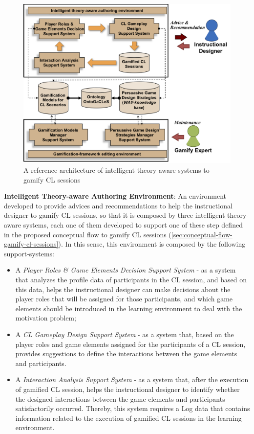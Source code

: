 \begin{figure}[htb]
 \caption{A reference architecture of intelligent theory-aware systems to gamify CL sessions}
 \label{fig:reference-architecture}
 \centering
 \includegraphics[width=1\textwidth]{images/chap-mechanisms-procedures/reference-architecture.png}
 \fautor
\end{figure}

\noindent
\textbf{Intelligent Theory-aware Authoring Environment}: An environment developed to provide advices and recommendations to help the instructional designer to gamify CL sessions, so that it is composed by three intelligent theory-aware systems, each one of them developed to support one of these step defined in the proposed conceptual flow to gamify CL sessions (\autoref{sec:conceptual-flow-gamify-cl-sessions}). In this sense, this environment is composed by the following support-systems:
\begin{itemize}
\item A \emph{Player Roles \& Game Elements Decision Support System} - as a system that analyzes the profile data of participants in the CL session, and based on this data, helps the instructional designer can make decisions about the player roles that will be assigned for those participants, and which game elements should be introduced in the learning environment to deal with the motivation problem;

\item A \emph{CL Gameplay Design Support System} - as a system that, based on the player roles and game elements assigned for the participants of a CL session, provides suggestions to define the interactions between the game elements and participants.

\item A \emph{Interaction Analysis Support System} - as a system that, after the execution of gamified CL session, helps the instructional designer to identify whether the designed interactions between the game elements and participants satisfactorily occurred. Thereby, this system requires a Log data that contains information related to the execution of gamified CL sessions in the learning environment.
\end{itemize}

